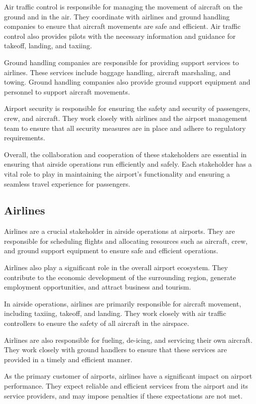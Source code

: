 Air traffic control is responsible for managing the movement of aircraft on the ground and in the air. They coordinate with airlines and ground handling companies to ensure that aircraft movements are safe and efficient. Air traffic control also provides pilots with the necessary information and guidance for takeoff, landing, and taxiing.

Ground handling companies are responsible for providing support services to airlines. These services include baggage handling, aircraft marshaling, and towing. Ground handling companies also provide ground support equipment and personnel to support aircraft movements.

Airport security is responsible for ensuring the safety and security of passengers, crew, and aircraft. They work closely with airlines and the airport management team to ensure that all security measures are in place and adhere to regulatory requirements.

Overall, the collaboration and cooperation of these stakeholders are essential in ensuring that airside operations run efficiently and safely. Each stakeholder has a vital role to play in maintaining the airport's functionality and ensuring a seamless travel experience for passengers.

    \subsection{Airlines}

    Airlines are a crucial stakeholder in airside operations at airports. They are responsible for scheduling flights and allocating resources such as aircraft, crew, and ground support equipment to ensure safe and efficient operations.

    Airlines also play a significant role in the overall airport ecosystem. They contribute to the economic development of the surrounding region, generate employment opportunities, and attract business and tourism.

    In airside operations, airlines are primarily responsible for aircraft movement, including taxiing, takeoff, and landing. They work closely with air traffic controllers to ensure the safety of all aircraft in the airspace.

    Airlines are also responsible for fueling, de-icing, and servicing their own aircraft. They work closely with ground handlers to ensure that these services are provided in a timely and efficient manner.

    As the primary customer of airports, airlines have a significant impact on airport performance. They expect reliable and efficient services from the airport and its service providers, and may impose penalties if these expectations are not met.

